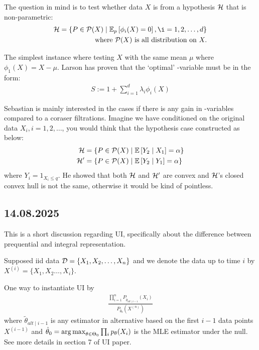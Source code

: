 The question in mind is to test whether data $X$ is from a hypothesis $\mathcal{H}$ that
is non-parametric:
\begin{align*}
    \Hc = \left\{P \in \Pc(X) \mid \ERWi{p}{\phi_i(X)=0}, \i=1,2,\dots,d\right\} \\
    \text{where } \Pc(X) \text{ is all distribution on } X.
\end{align*}

The simplest instance where testing $X$ with the same mean $\mu$ where
$\phi_1(X)=X-\mu$.
Larson has proven that the `optimal' \E-variable must be in the form:
\begin{align*}
    S := 1 +\sum_{i=1}^d \lambda_i \phi_i(X)
\end{align*}

Sebastian is mainly interested in the cases if there is any gain in \E-variables
compared to a coraser filtrations. 
Imagine we have conditioned on the original data $X_i, i=1,2,\dots$, you would think
that the hypothesis case constructed as below:
\begin{align}
    \Hc  &= \left\{P \in \Pc(X) \mid \condERW{Y_2}{X_1} = \alpha \right\} \\
    \Hc' &= \left\{P \in \Pc(X) \mid \condERW{Y_2}{Y_1} = \alpha \right\}
\end{align}
where $Y_i = 1_{X_i \leq q}$. He showed that both $\mathcal{H}$ and $\mathcal{H}'$ are convex
and $\mathcal{H}$'s closed convex hull is not the same, otherwise it would be kind of pointless.


\subsection*{14.08.2025}

This is a short discussion regarding UI, specifically about the difference
between prequential and integral representation.

Supposed iid data $\mathcal{D}=\{X_1,X_2,\dots,X_n\}$ and we denote 
the data up to time $i$ by $X^{(i)}=\{X_1,X_2\dots,X_i\}$.

One way to instantiate UI by
\begin{align*}
\frac{\prod_{i=1}^n P_{\tilde{\theta}_{alt\mid i-1}}(X_i)}{P_{\hat{\theta}_0}(X^{(n)})}
\end{align*}
where $\tilde{\theta}_{alt\mid i-1}$ is any estimator in alternative based on 
the first $i-1$ data points $X^{(i-1)}$
and $\hat{\theta}_0=\operatorname*{arg\, max}_{\theta\in\Theta_0} \prod_i p_{\theta}(X_i)$ 
is the MLE estimator under the null. 
See more details in section 7 of UI paper.

